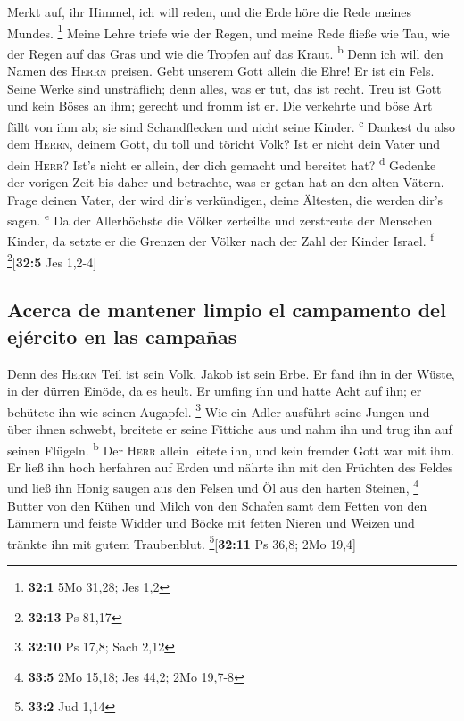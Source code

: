  Merkt auf, ihr Himmel, ich will reden, und die Erde höre
die Rede meines Mundes. \footnote{\textbf{32:1} 5Mo 31,28; Jes 1,2}
 Meine Lehre triefe wie der Regen, und meine Rede fließe
wie Tau, wie der Regen auf das Gras und wie die Tropfen auf das Kraut.
\textsuperscript{b}  Denn ich will den Namen des
\textsc{Herrn} preisen. Gebt unserem Gott allein die Ehre!
 Er ist ein Fels. Seine Werke sind unsträflich; denn
alles, was er tut, das ist recht. Treu ist Gott und kein Böses an ihm;
gerecht und fromm ist er.  Die verkehrte und böse Art
fällt von ihm ab; sie sind Schandflecken und nicht seine Kinder.
\textsuperscript{c}  Dankest du also dem \textsc{Herrn},
deinem Gott, du toll und töricht Volk? Ist er nicht dein Vater und dein
\textsc{Herr}? Ist's nicht er allein, der dich gemacht und bereitet hat?
\textsuperscript{d}  Gedenke der vorigen Zeit bis daher
und betrachte, was er getan hat an den alten Vätern. Frage deinen Vater,
der wird dir's verkündigen, deine Ältesten, die werden dir's sagen.
\textsuperscript{e}  Da der Allerhöchste die Völker
zerteilte und zerstreute der Menschen Kinder, da setzte er die Grenzen
der Völker nach der Zahl der Kinder Israel. \textsuperscript{f}
\footnote{\textbf{32:13} Ps 81,17}{[}\textbf{32:5} Jes 1,2-4{]}

\hypertarget{acerca-de-mantener-limpio-el-campamento-del-ejuxe9rcito-en-las-campauxf1as}{%
\subsection{Acerca de mantener limpio el campamento del ejército en las
campañas}\label{acerca-de-mantener-limpio-el-campamento-del-ejuxe9rcito-en-las-campauxf1as}}

 Denn des \textsc{Herrn} Teil ist sein Volk, Jakob ist
sein Erbe.  Er fand ihn in der Wüste, in der dürren
Einöde, da es heult. Er umfing ihn und hatte Acht auf ihn; er behütete
ihn wie seinen Augapfel. \footnote{\textbf{32:10} Ps 17,8; Sach 2,12}
 Wie ein Adler ausführt seine Jungen und über ihnen
schwebt, breitete er seine Fittiche aus und nahm ihn und trug ihn auf
seinen Flügeln. \textsuperscript{b}  Der \textsc{Herr}
allein leitete ihn, und kein fremder Gott war mit ihm. 
Er ließ ihn hoch herfahren auf Erden und nährte ihn mit den Früchten des
Feldes und ließ ihn Honig saugen aus den Felsen und Öl aus den harten
Steinen, \footnote{\textbf{33:5} 2Mo 15,18; Jes 44,2; 2Mo 19,7-8}
 Butter von den Kühen und Milch von den Schafen samt dem
Fetten von den Lämmern und feiste Widder und Böcke mit fetten Nieren und
Weizen und tränkte ihn mit gutem Traubenblut.
\footnote{\textbf{33:2} Jud 1,14}{[}\textbf{32:11} Ps 36,8; 2Mo 19,4{]}


